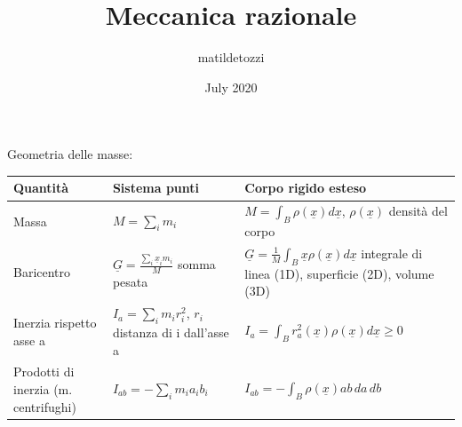 \documentclass{article}
\title{Meccanica razionale}
\author{matildetozzi}
\date{July 2020}
\begin{document}
\thispagestyle{empty}
Geometria delle masse:

\begin{tabular}{ |m{4cm}|m{7cm}|m{6cm}| } 
 \hline
 Quantità & Sistema punti & Corpo rigido esteso \\ 
 \hline
 Massa & $M = \sum_{i} m_i$ & $M = \int_{B} \rho(\underline{x}) d\underline{x}$, $\rho(\underline{x})$ densità del corpo \\ 
 \hline 
 Baricentro & $\underline{G} = \frac{\sum_{i}\underline{x}_{i}m_{i}}{M}$ somma pesata & $\underline{G} = \frac{1}{M}\int_{B}\underline{x}\rho(\underline{x})d\underline{x}$ integrale di linea (1D), superficie (2D), volume (3D)\\
 \hline
 Inerzia rispetto asse a & $I_{a} = \sum_{i} m_i r_{i}^{2}$, $r_{i}$ distanza di i dall'asse a & $I_{a} = \int_{B} r_{a}^{2}(\underline{x})\rho(\underline{x})d\underline{x}\geq 0$ \\ 
 \hline
 Prodotti di inerzia (m. centrifughi) & $I_{ab} = -\sum_{i} m_{i}a_{i}b_{i}$ & $I_{ab} = -\int_{B} {\rho(\underline{x})ab} \,da \,db$ \\
 \hline
\end{tabular}
\end{document}

